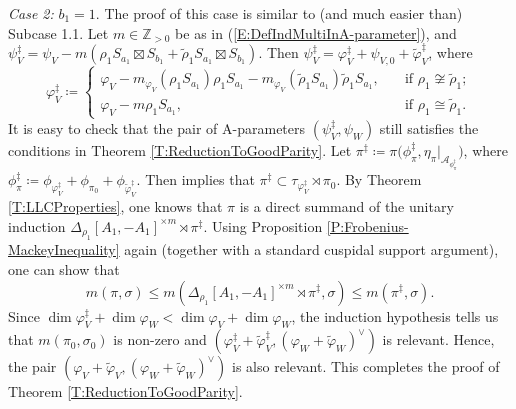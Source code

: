 \documentclass[11pt,letterpaper]{amsart}
\theoremstyle{plain}
\newcounter{theorem}[section]
\numberwithin{theorem}{section}
\numberwithin{equation}{subsection}
\theoremstyle{remark}
\newcommand{\Z}{\mathbb{Z}}
\def\calA{\mathcal{A}}
\begin{document}
\emph{Case 2:} $b_1=1$. The proof of this case is similar to (and much easier than) Subcase 1.1. Let $m\in\Z_{>0}$ be as in (\ref{E:DefIndMultiInA-parameter}), and $\psi_V^\ddagger = \psi_V - m\left(\rho_1 S_{a_1}\boxtimes S_{b_1} + \widetilde{\rho}_1 S_{a_1}\boxtimes S_{b_1}\right)$. Then $\psi_V^\ddagger = \varphi_V^\ddagger + \psi_{V,0}+ \widetilde{\varphi}_V^\ddagger$, where
\[
    \varphi_V^\ddagger\coloneqq \begin{cases}
       \varphi_V - m_{\varphi_V}\left(\rho_1 S_{a_1}\right)\rho_1 S_{a_1} - m_{\varphi_V}\left(\widetilde{\rho}_1S_{a_1}\right) \widetilde{\rho}_1S_{a_1}, \quad &\text{if } \rho_1\not\cong \widetilde{\rho}_1;\\
       \varphi_V - m\rho_1 S_{a_1}, \quad &\text{if } \rho_1\cong \widetilde{\rho}_1.
    \end{cases}
\]
It is easy to check that the pair of A-parameters $\left(\psi_V^\ddagger,\psi_W\right)$ still satisfies the conditions in Theorem \ref{T:ReductionToGoodParity}. Let $\pi^\ddagger\coloneqq\pi\Big(\phi_\pi^\ddagger,\eta_\pi\big|_{\calA_{\phi_\pi^\ddagger}}\Big)$, where $\phi_\pi^\ddagger\coloneqq \phi_{\varphi_V^\ddagger} + \phi_{\pi_0} + \phi_{\widetilde{\varphi}_V^\ddagger}$. Then \cite[Prop. 5.3]{MR2504024} implies that $\pi^\ddagger\subset\tau_{\varphi_V^\ddagger}\rtimes\pi_0$. By Theorem \ref{T:LLCProperties}, one knows that $\pi$ is a direct summand of the unitary induction $\Delta_{\rho_1}\left[A_1,-A_1\right]^{\times m}\rtimes \pi^\ddagger$. Using Proposition \ref{P:Frobenius-MackeyInequality} again (together with a standard cuspidal support argument), one can show that
\[
    m\left(\pi,\sigma\right) \leq m\left(\Delta_{\rho_1}\left[A_1,-A_1\right]^{\times m}\rtimes \pi^\ddagger,\sigma\right) \leq m\left(\pi^\ddagger,\sigma\right).
\]
Since $\dim\varphi_V^\ddagger + \dim \varphi_W<\dim\varphi_V + \dim \varphi_W$, the induction hypothesis tells us that $m\left(\pi_0,\sigma_0\right)$ is non-zero and $\left(\varphi_V^\ddagger+\widetilde{\varphi}_V^\ddagger, \left(\varphi_W+\widetilde{\varphi}_W\right)^\vee\right)$ is relevant. Hence, the pair $\left(\varphi_V+\widetilde{\varphi}_V, \left(\varphi_W+\widetilde{\varphi}_W\right)^\vee\right)$ is also relevant. This completes the proof of Theorem \ref{T:ReductionToGoodParity}.


\vskip 10pt

\end{document}
